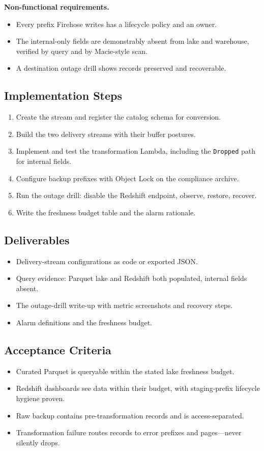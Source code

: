 \textbf{Non-functional requirements.}
\begin{itemize}
    \item Every prefix Firehose writes has a lifecycle policy and an owner.
    \item The internal-only fields are demonstrably absent from lake and warehouse, verified by query and by Macie-style scan.
    \item A destination outage drill shows records preserved and recoverable.
\end{itemize}

\subsection*{Implementation Steps}
\begin{enumerate}
    \item Create the stream and register the catalog schema for conversion.
    \item Build the two delivery streams with their buffer postures.
    \item Implement and test the transformation Lambda, including the \texttt{Dropped} path for internal fields.
    \item Configure backup prefixes with Object Lock on the compliance archive.
    \item Run the outage drill: disable the Redshift endpoint, observe, restore, recover.
    \item Write the freshness budget table and the alarm rationale.
\end{enumerate}

\subsection*{Deliverables}
\begin{itemize}
    \item Delivery-stream configurations as code or exported JSON.
    \item Query evidence: Parquet lake and Redshift both populated, internal fields absent.
    \item The outage-drill write-up with metric screenshots and recovery steps.
    \item Alarm definitions and the freshness budget.
\end{itemize}

\subsection*{Acceptance Criteria}
\begin{itemize}
    \item Curated Parquet is queryable within the stated lake freshness budget.
    \item Redshift dashboards see data within their budget, with staging-prefix lifecycle hygiene proven.
    \item Raw backup contains pre-transformation records and is access-separated.
    \item Transformation failure routes records to error prefixes and pages---never silently drops.
\end{itemize}

